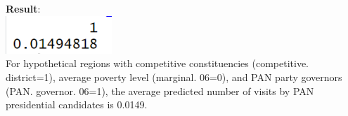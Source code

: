 \documentclass[12pt,letterpaper]{article}
\begin{document}
\begin{enumerate}
	 
	\textbf{Result}:\\
	\includegraphics[width=0.3\textwidth]{Q2_2.png}\\
	 For hypothetical regions with competitive constituencies (competitive. district=1), average poverty level (marginal. 06=0), and PAN party governors (PAN. governor. 06=1), the average predicted number of visits by PAN presidential candidates is 0.0149.\\
\end{enumerate}
\end{document}
